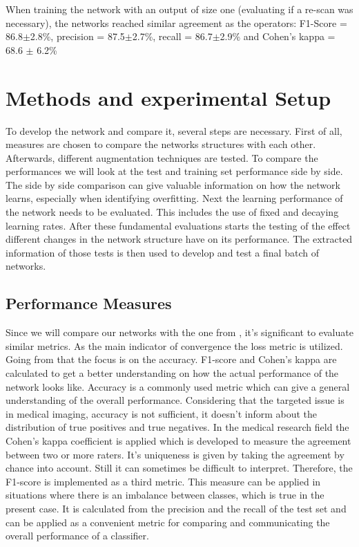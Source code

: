 \documentclass[
a4paper, 
12pt,
grayscalebody, %
abstract=on,
twoside, BCOR10mm, 12pt, DIV13,headinclude, footexclude, final, abstracton, openright
]{ibireprt}
\numberwithin{equation}{chapter}
\numberwithin{table}{chapter}
\numberwithin{figure}{chapter}
\numberwithin{algorithm}{chapter}
\numberwithin{example}{chapter}
\numberwithin{example}{chapter}
\begin{document}
 When training the network with an output of size one (evaluating if a re-scan was necessary), the networks reached similar agreement as the operators:  F1-Score = 86.8$\pm$2.8\%, precision = 87.5$\pm$2.7\%, recall = 86.7$\pm$2.9\% and Cohen's kappa = 68.6 $\pm$ 6.2\% 

\chapter{Methods and experimental Setup }

To develop the network and compare it, several steps are necessary. First of all, measures are chosen to compare the networks structures with each other. Afterwards, different augmentation techniques are tested. To compare the performances we will look at the test and training set performance side by side. The side by side comparison can give valuable information on how the network learns, especially when identifying overfitting. Next the learning performance of the network needs to be evaluated. This includes the use of fixed and decaying learning rates. After these fundamental evaluations starts the testing of the effect different changes in the network structure have on its performance. The extracted information of those tests is then used to develop and test a final batch of networks.

\section{Performance Measures}
Since we will compare our networks with the one from \cite{Walle2023}, it's significant to evaluate similar metrics. As the main indicator of convergence the loss metric is utilized. Going from that the focus is on the accuracy. F1-score and Cohen's kappa are calculated to get a better understanding on how the actual performance of the network looks like. Accuracy is a commonly used metric which can give a general understanding of the overall performance. Considering that the targeted issue is in medical imaging, accuracy is not sufficient, it doesn't inform about the distribution of true positives and true negatives. In the medical research field the Cohen's kappa coefficient is applied which is developed to measure the agreement between two or more raters. It's uniqueness is given by taking the agreement by chance into account. Still it can sometimes be difficult to interpret. 
Therefore, the F1-score is implemented as a third metric. This measure can be applied in situations where there is an imbalance between classes, which is true in the present case. It is calculated from the precision and the recall of the test set and can  be applied as a convenient metric for comparing and communicating the overall performance of a classifier. 
\end{document}
